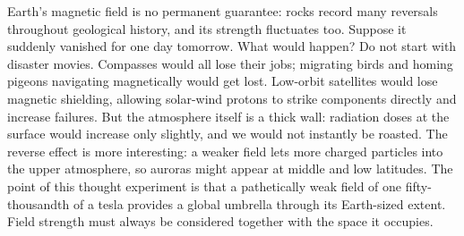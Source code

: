 
\begin{thought}
Earth's magnetic field is no permanent guarantee: rocks record many reversals throughout geological history, and its strength fluctuates too. Suppose it suddenly vanished for one day tomorrow. What would happen? Do not start with disaster movies. Compasses would all lose their jobs; migrating birds and homing pigeons navigating magnetically would get lost. Low-orbit satellites would lose magnetic shielding, allowing solar-wind protons to strike components directly and increase failures. But the atmosphere itself is a thick wall: radiation doses at the surface would increase only slightly, and we would not instantly be roasted. The reverse effect is more interesting: a weaker field lets more charged particles into the upper atmosphere, so auroras might appear at middle and low latitudes. The point of this thought experiment is that a pathetically weak field of one fifty-thousandth of a tesla provides a global umbrella through its Earth-sized extent. Field strength must always be considered together with the space it occupies.
\end{thought}

